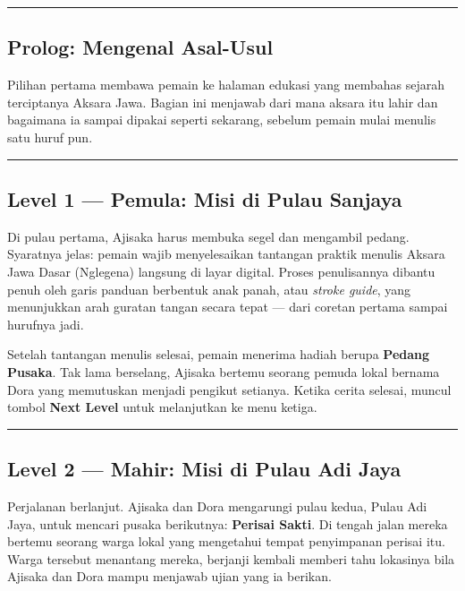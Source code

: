 \documentclass[
  11pt,
]{article}
\begin{document}
\begin{center}\rule{0.5\linewidth}{0.5pt}\end{center}

\subsection{Prolog: Mengenal Asal-Usul}\label{prolog-mengenal-asal-usul}

Pilihan pertama membawa pemain ke halaman edukasi yang membahas sejarah
terciptanya Aksara Jawa. Bagian ini menjawab dari mana aksara itu lahir
dan bagaimana ia sampai dipakai seperti sekarang, sebelum pemain mulai
menulis satu huruf pun.

\begin{center}\rule{0.5\linewidth}{0.5pt}\end{center}

\subsection{Level 1 --- Pemula: Misi di Pulau
Sanjaya}\label{level-1-pemula-misi-di-pulau-sanjaya}

Di pulau pertama, Ajisaka harus membuka segel dan mengambil pedang.
Syaratnya jelas: pemain wajib menyelesaikan tantangan praktik menulis
Aksara Jawa Dasar (Nglegena) langsung di layar digital. Proses
penulisannya dibantu penuh oleh garis panduan berbentuk anak panah, atau
\emph{stroke guide}, yang menunjukkan arah guratan tangan secara tepat
--- dari coretan pertama sampai hurufnya jadi.

Setelah tantangan menulis selesai, pemain menerima hadiah berupa
\textbf{Pedang Pusaka}. Tak lama berselang, Ajisaka bertemu seorang
pemuda lokal bernama Dora yang memutuskan menjadi pengikut setianya.
Ketika cerita selesai, muncul tombol \textbf{Next Level} untuk
melanjutkan ke menu ketiga.

\begin{center}\rule{0.5\linewidth}{0.5pt}\end{center}

\subsection{Level 2 --- Mahir: Misi di Pulau Adi
Jaya}\label{level-2-mahir-misi-di-pulau-adi-jaya}

Perjalanan berlanjut. Ajisaka dan Dora mengarungi pulau kedua, Pulau Adi
Jaya, untuk mencari pusaka berikutnya: \textbf{Perisai Sakti}. Di tengah
jalan mereka bertemu seorang warga lokal yang mengetahui tempat
penyimpanan perisai itu. Warga tersebut menantang mereka, berjanji
kembali memberi tahu lokasinya bila Ajisaka dan Dora mampu menjawab
ujian yang ia berikan.
\end{document}
